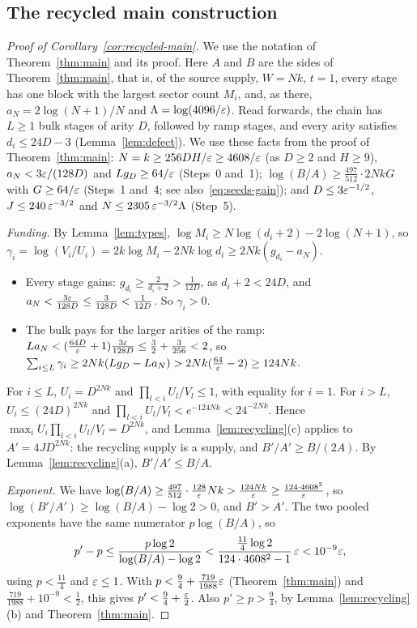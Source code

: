 \subsection{The recycled main construction}
\label{subsec:lower-recycled-proof}

\begin{proof}[Proof of Corollary~\ref{cor:recycled-main}]
We use the notation of Theorem~\ref{thm:main} and its proof. Here
\(A\) and \(B\) are the sides of Theorem~\ref{thm:main}, that is, of the
source supply, \(W=Nk\), \(t=1\), every stage has one block with the
largest sector count \(M_i\), and, as there, \(a_N=2\log(N+1)/N\) and
\(\Lambda=\log(4096/\varepsilon)\). Read forwards, the chain has \(L\ge1\) bulk
stages of arity \(D\), followed by ramp stages, and every arity
satisfies \(d_i\le24D-3\) (Lemma~\ref{lem:defect}). We use these facts
from the proof of Theorem~\ref{thm:main}: \(N=k\ge256DH/\varepsilon\ge4608/\varepsilon\)
(as \(D\ge2\) and \(H\ge9\)), \(a_N<3\varepsilon/(128D)\) and
\(Lg_D\ge64/\varepsilon\) (Steps~0 and~1);
\(\log(B/A)\ge\frac{497}{512}\cdot2NkG\) with \(G\ge64/\varepsilon\)
(Steps~1 and~4; see also~\eqref{eq:seeds-gain}); and \(D\le3\varepsilon^{-1/2}\),
\(J\le240\,\varepsilon^{-3/2}\) and \(N\le2305\,\varepsilon^{-3/2}\Lambda\) (Step~5).

\emph{Funding.} By Lemma~\ref{lem:types},
\(\log M_i\ge N\log(d_i+2)-2\log(N+1)\), so
\(\gamma_i=\log(V_i/U_i)=2k\log M_i-2Nk\log d_i\ge2Nk(g_{d_i}-a_N)\).
\begin{itemize}
\item Every stage gains: \(g_{d_i}\ge\frac2{d_i+2}>\frac1{12D}\), as
\(d_i+2<24D\), and \(a_N<\frac{3\varepsilon}{128D}\le\frac3{128D}<\frac1{12D}\).
So \(\gamma_i>0\).
\item The bulk pays for the larger arities of the ramp:
\(La_N<(\frac{64D}{\varepsilon}+1)\frac{3\varepsilon}{128D}\le\frac32+\frac3{256}<2\), so
\(\sum_{i\le L}\gamma_i\ge2Nk(Lg_D-La_N)>2Nk(\frac{64}{\varepsilon}-2)\ge124Nk\).
\end{itemize}
For \(i\le L\), \(U_i=D^{2Nk}\) and \(\prod_{l<i}U_l/V_l\le1\), with
equality for \(i=1\). For \(i>L\), \(U_i\le(24D)^{2Nk}\) and
\(\prod_{l<i}U_l/V_l<e^{-124Nk}<24^{-2Nk}\). Hence
\(\max_iU_i\prod_{l<i}U_l/V_l=D^{2Nk}\), and
Lemma~\ref{lem:recycling}(c) applies to \(A'=4JD^{2Nk}\): the recycling
supply is a supply, and \(B'/A'\ge B/(2A)\). By
Lemma~\ref{lem:recycling}(a), \(B'/A'\le B/A\).

\emph{Exponent.} We have
\(\log(B/A)\ge\frac{497}{512}\cdot\frac{128}{\varepsilon} Nk>\frac{124Nk}{\varepsilon}\ge\frac{124\cdot4608^2}{\varepsilon}\),
so \(\log(B'/A')\ge\log(B/A)-\log2>0\), and \(B'>A'\). The two pooled
exponents have the same numerator \(p\log(B/A)\), so
\[
 p'-p\le\frac{p\log2}{\log(B/A)-\log2}
 <\frac{\frac{11}4\log2}{124\cdot4608^2-1}\,\varepsilon<10^{-9}\varepsilon,
\]
using \(p<\frac{11}4\) and \(\varepsilon\le1\). With
\(p<\frac94+\frac{719}{1988}\varepsilon\) (Theorem~\ref{thm:main}) and
\(\frac{719}{1988}+10^{-9}<\frac12\), this gives
\(p'<\frac94+\frac{\varepsilon}2\). Also \(p'\ge p>\frac94\), by
Lemma~\ref{lem:recycling}(b) and Theorem~\ref{thm:main}.


\end{proof}
